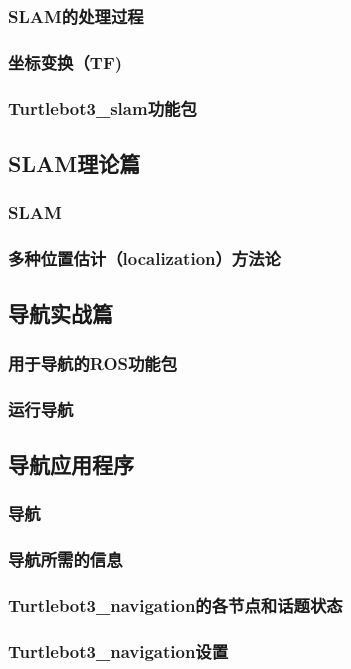 \documentclass[geye,green,kindle,cn]{elegantnote}
\begin{document}
\subsubsection{SLAM的处理过程}
\subsubsection{坐标变换（TF)}
\subsubsection{Turtlebot3\_slam功能包}
\subsection{SLAM理论篇}
\subsubsection{SLAM}
\subsubsection{多种位置估计（localization）方法论}
\subsection{导航实战篇}
\subsubsection{用于导航的ROS功能包}
\subsubsection{运行导航}
\subsection{导航应用程序}
\subsubsection{导航}
\subsubsection{导航所需的信息}
\subsubsection{Turtlebot3\_navigation的各节点和话题状态}
\subsubsection{Turtlebot3\_navigation设置}
\end{document}
